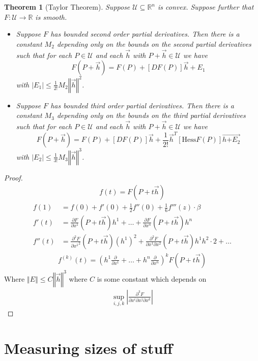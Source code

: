 \documentclass[12pt]{armath}
\newtheorem{theorem}{Theorem}[section]
\newcommand{\U}{\mathcal{U}}
\newcommand{\ra}{\rightarrow}
\newcommand{\R}{\mathbb{R}}
\newcommand{\abs}[1]{\left\vert{#1}\right\vert}
\newcommand{\aabs}[1]{\left\Vert{#1}\right\Vert}
\newcommand{\pder}[2]{\frac{\partial #1}{\partial #2}}
\newcommand{\ppder}[2]{\frac{\partial^2 #1}{{\partial #2}^2}}
\begin{document}
\begin{theorem}[Taylor Theorem]
  Suppose $\U\subseteq\R^n$ is convex. Suppose further that $F:\U\ra\R$ is
  smooth.
  \begin{itemize}
    \item Suppose $F$ has bounded second order partial derivatives. Then there
      is a constant $M_2$ depending only on the bounds on the second partial
      derivatives such that for each $P\in \U$ and each $\vec{h}$ with
      $P+\vec{h}\in\U$ we have
      \[
        F(P+\vec{h})=F(P)+[DF(P)]\vec{h}+E_1
      \]
      with $\abs{E_1}\leq\frac{1}{2!}M_2\aabs{\vec{h}}^2$.
    \item Suppose $F$ has bounded third order partial derivatives. Then there
      is a constant $M_3$ depending only on the bounds on the third partial
      derivatives such that for each $P\in\U$ and each $\vec{h}$ with
      $P+\vec{h}\in\U$ we have
      \[
        F(P+\vec{h})=F(P)+[DF(P)]\vec{h}+\frac{1}{2!}\vec{h}^T[\text{Hess}F(P)]\vec{h{+E_2}}
      \]
      with $\abs{E_2}\leq\frac{1}{3!}M_3\aabs{\vec{h}}^3$.
  \end{itemize}
\end{theorem}

\begin{proof}
  \begin{align*}
     f(t)=F(P+t\vec{h})
  \end{align*}
  \begin{align*}
    f(1)&=f(0)+f'(0)+\frac{1}{2}f''(0)+\frac{1}{6}f'''(z)\cdot \beta\\
    f'(t)&=\pder{F}{x^1}(P+t\vec{h})h^1+\ldots+\pder{F}{x^n}(P+t\vec{h})h^n\\
    f''(t)&=\ppder{F}{x^1}(P+t\vec{h})(h^1)^2+\frac{\partial^2 F}{\partial
    x^1\partial x^2}(P+t\vec{h})h^1h^2\cdot 2+\ldots
  \end{align*}
  \begin{align*}
    f^{(k)}(t)=\left(h^1\pder{}{x^1}+\ldots+h^n\pder{}{x^n}\right)^kF(P+t\vec{h})
  \end{align*}
  Where $\aabs{E}\leq C\aabs{\vec{h}}^3$ where $C$ is some constant which
  depends on
  \begin{align*}
    \sup_{i,j,k}\abs{\frac{\partial^3 F}{\partial x^i\partial x^j\partial x^k}}
  \end{align*}
\end{proof}

\section{Measuring sizes of stuff}%
\label{sec:measuring_sizes_of_stuff}
\end{document}
